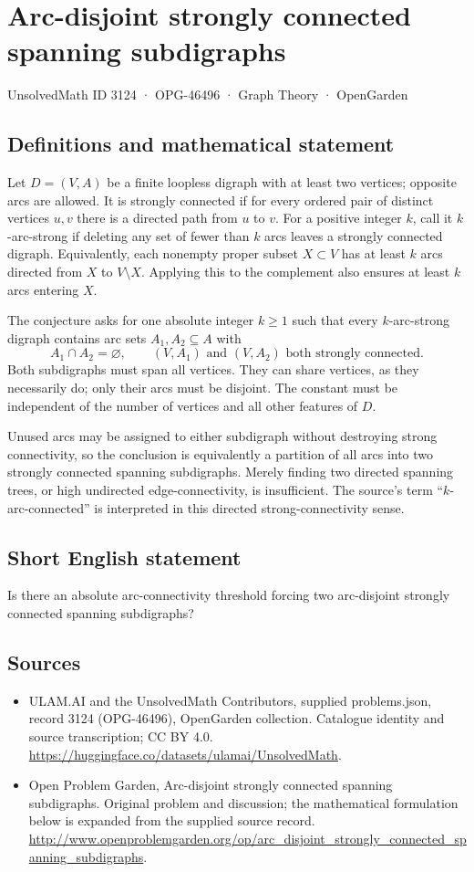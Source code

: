 \documentclass[11pt,a4paper]{article}
\begin{document}
\section*{Arc-disjoint strongly connected spanning subdigraphs}\label{3124}
{\small UnsolvedMath ID 3124 · OPG-46496 · Graph Theory · OpenGarden}
\subsection{Definitions and mathematical statement}
Let $D=(V,A)$ be a finite loopless digraph with at least two vertices;
opposite arcs are allowed. It is strongly connected if for every ordered
pair of distinct vertices $u,v$ there is a directed path from $u$ to $v$.
For a positive integer $k$, call it $k$-arc-strong if deleting any set
of fewer than $k$ arcs leaves a strongly connected digraph.
Equivalently, each nonempty proper subset $X\subset V$ has at least
$k$ arcs directed from $X$ to $V\setminus X$. Applying this to the
complement also ensures at least $k$ arcs entering $X$.

The conjecture asks for one absolute integer $k\ge1$ such that every
$k$-arc-strong digraph contains arc sets $A_1,A_2\subseteq A$ with
\[
 A_1\cap A_2=\varnothing,\qquad
 (V,A_1)\text{ and }(V,A_2)\text{ both strongly connected}.
\]
Both subdigraphs must span all vertices. They can share vertices, as
they necessarily do; only their arcs must be disjoint. The constant
must be independent of the number of vertices and all other features
of $D$.

Unused arcs may be assigned to either subdigraph without destroying
strong connectivity, so the conclusion is equivalently a partition of
all arcs into two strongly connected spanning subdigraphs. Merely finding
two directed spanning trees, or high undirected edge-connectivity, is
insufficient. The source's term ``$k$-arc-connected'' is interpreted in
this directed strong-connectivity sense.
\subsection{Short English statement}
Is there an absolute arc-connectivity threshold forcing two arc-disjoint strongly connected spanning subdigraphs?
\subsection{Sources}
\begin{itemize}
\item[S1] ULAM.AI and the UnsolvedMath Contributors, supplied problems.json, record 3124 (OPG-46496), OpenGarden collection. Catalogue identity and source transcription; CC BY 4.0.
\url{https://huggingface.co/datasets/ulamai/UnsolvedMath}.
\item[S2] Open Problem Garden, Arc-disjoint strongly connected spanning subdigraphs. Original problem and discussion; the mathematical formulation below is expanded from the supplied source record.
\url{http://www.openproblemgarden.org/op/arc_disjoint_strongly_connected_spanning_subdigraphs}.
\end{itemize}
\end{document}
